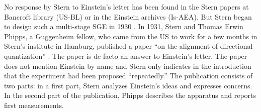 \documentclass{article}
\begin{document}
No response by Stern to Einstein's letter has been found in the Stern papers at Bancroft library (US-BL) or in the Einstein archives (Is-AEA). But Stern began to design such a multi-stage SGE in 1930 \cite[p.~186]{PhippsTEtal1932Einstellung}. In 1931, Stern and Thomas Erwin Phipps, a Guggenheim fellow, who came from the US to work for a few months in Stern's institute in Hamburg, published a paper ``on the alignment of directional quantization''   
\citep{PhippsTEtal1932Einstellung}.
The paper is de-facto an answer to Einstein's letter. The paper does not mention Einstein by name and Stern only indicates in the introduction that the experiment had been proposed ``repeatedly.'' The publication consists of two parts: in a first part, Stern analyzes Einstein's ideas and expresses concerns. In the second part of the publication, Phipps describes the apparatus and reports first measurements.
\end{document}
